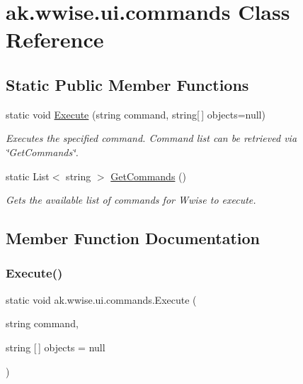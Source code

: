 \hypertarget{classak_1_1wwise_1_1ui_1_1commands}{}\section{ak.\+wwise.\+ui.\+commands Class Reference}
\label{classak_1_1wwise_1_1ui_1_1commands}
\subsection*{Static Public Member Functions}
\begin{DoxyCompactItemize}
\item 
static void \mbox{\hyperlink{classak_1_1wwise_1_1ui_1_1commands_ad06a557be9e56b9b109fab9fd87b3e77}{Execute}} (string command, string\mbox{[}$\,$\mbox{]} objects=null)
\begin{DoxyCompactList}\small\item\em Executes the specified command. Command list can be retrieved via \char`\"{}\+Get\+Commands\char`\"{}. \end{DoxyCompactList}\item 
static List$<$ string $>$ \mbox{\hyperlink{classak_1_1wwise_1_1ui_1_1commands_a094dd580f67690f17ed4d4b4ec0ce8bf}{Get\+Commands}} ()
\begin{DoxyCompactList}\small\item\em Gets the available list of commands for Wwise to execute. \end{DoxyCompactList}\end{DoxyCompactItemize}


\subsection{Member Function Documentation}
\mbox{\label{classak_1_1wwise_1_1ui_1_1commands_ad06a557be9e56b9b109fab9fd87b3e77}} 
\subsubsection{\texorpdfstring{Execute()}{Execute()}}
{\footnotesize\ttfamily static void ak.\+wwise.\+ui.\+commands.\+Execute (\begin{DoxyParamCaption}\item[{string}]{command,  }\item[{string \mbox{[}$\,$\mbox{]}}]{objects = {\ttfamily null} }\end{DoxyParamCaption})\hspace{0.3cm}{\ttfamily [static]}}



